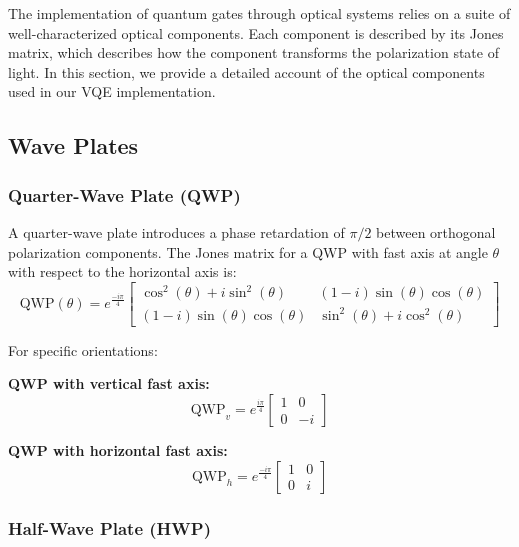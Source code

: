 \documentclass[
	a4paper,
	12pt,
	oneside,
]{article}
\begin{document}
The implementation of quantum gates through optical systems relies on a suite of well-characterized optical components. Each component is described by its Jones matrix, which describes how the component transforms the polarization state of light. In this section, we provide a detailed account of the optical components used in our VQE implementation.

\subsection{Wave Plates}

\subsubsection{Quarter-Wave Plate (QWP)}

A quarter-wave plate introduces a phase retardation of $\pi/2$ between orthogonal polarization components. The Jones matrix for a QWP with fast axis at angle $\theta$ with respect to the horizontal axis is:
\begin{equation}
\text{QWP}(\theta) = e^{\frac{-i\pi}{4}} \begin{bmatrix}
	\cos^2(\theta) + i\sin^2(\theta) & (1-i)\sin(\theta)\cos(\theta) \\
	(1-i)\sin(\theta)\cos(\theta) & \sin^2(\theta) + i\cos^2(\theta)
\end{bmatrix}
\end{equation}

For specific orientations:

\textbf{QWP with vertical fast axis:}
\begin{equation}
\text{QWP}_v = e^{\frac{i\pi}{4}} \begin{bmatrix}
	1 & 0 \\
	0 & -i
\end{bmatrix}
\end{equation}

\textbf{QWP with horizontal fast axis:}
\begin{equation}
\text{QWP}_h = e^{\frac{-i\pi}{4}} \begin{bmatrix}
	1 & 0 \\
	0 & i
\end{bmatrix}
\end{equation}

\subsubsection{Half-Wave Plate (HWP)}
\end{document}
